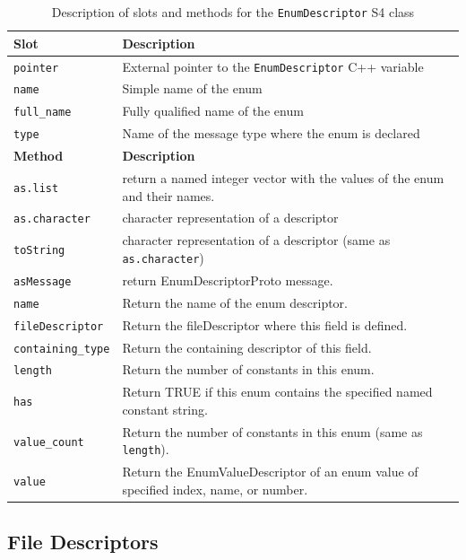 \documentclass[article]{jss}
\begin{document}
\begin{table}[h]
\centering
\begin{small}
\begin{tabular}{l|p{10cm}}
\hline
\textbf{Slot} & \textbf{Description} \\
\hline
\texttt{pointer} & External pointer to the \texttt{EnumDescriptor} C++ variable \\
\hline
\texttt{name} & Simple name of the enum \\
\hline
\texttt{full\_name} & Fully qualified name of the enum \\
\hline
\texttt{type} & Name of the message type where the enum is declared \\[.3cm]
\hline
\textbf{Method} & \textbf{Description} \\
\hline
\texttt{as.list} & return a named
integer vector with the values of the enum and their names.\\
\texttt{as.character} & character representation of a descriptor\\
\texttt{toString} & character
representation of a descriptor (same as \texttt{as.character}) \\
\texttt{asMessage} & return EnumDescriptorProto message. \\
\texttt{name} & Return the name of the enum descriptor.\\
\texttt{fileDescriptor} & Return the fileDescriptor where this field is defined.\\
\texttt{containing\_type} & Return the containing descriptor of this field.\\
\texttt{length} & Return the number of constants in this enum.\\
\texttt{has} & Return TRUE if this enum contains the specified named constant string.\\
\texttt{value\_count} & Return the number of constants in this enum (same as \texttt{length}).\\
\texttt{value} & Return the EnumValueDescriptor of an enum value of specified index, name, or number.\\
\hline
\end{tabular}
\end{small}
\caption{\label{enumdescriptor-methods-table}Description of slots and methods for the \texttt{EnumDescriptor} S4 class}
\end{table}

\subsection{File Descriptors}
\label{subsec-file-descriptor}
\end{document}
